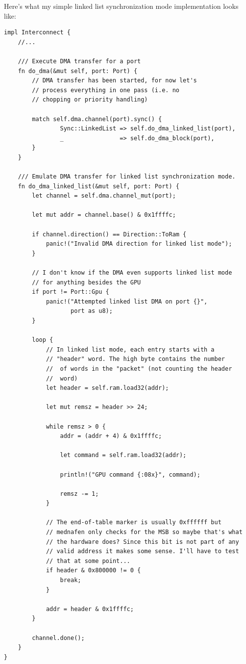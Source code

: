\documentclass[a4paper]{article}
\begin{document}
Here's what my simple linked list synchronization mode implementation
looks like:

\begin{lstlisting}
impl Interconnect {
    //...

    /// Execute DMA transfer for a port
    fn do_dma(&mut self, port: Port) {
        // DMA transfer has been started, for now let's
        // process everything in one pass (i.e. no
        // chopping or priority handling)

        match self.dma.channel(port).sync() {
                Sync::LinkedList => self.do_dma_linked_list(port),
                _                => self.do_dma_block(port),
        }
    }

    /// Emulate DMA transfer for linked list synchronization mode.
    fn do_dma_linked_list(&mut self, port: Port) {
        let channel = self.dma.channel_mut(port);

        let mut addr = channel.base() & 0x1ffffc;

        if channel.direction() == Direction::ToRam {
            panic!("Invalid DMA direction for linked list mode");
        }

        // I don't know if the DMA even supports linked list mode
        // for anything besides the GPU
        if port != Port::Gpu {
            panic!("Attempted linked list DMA on port {}",
                   port as u8);
        }

        loop {
            // In linked list mode, each entry starts with a
            // "header" word. The high byte contains the number
            //  of words in the "packet" (not counting the header
            //  word)
            let header = self.ram.load32(addr);

            let mut remsz = header >> 24;

            while remsz > 0 {
                addr = (addr + 4) & 0x1ffffc;

                let command = self.ram.load32(addr);

                println!("GPU command {:08x}", command);

                remsz -= 1;
            }

            // The end-of-table marker is usually 0xffffff but
            // mednafen only checks for the MSB so maybe that's what
            // the hardware does? Since this bit is not part of any
            // valid address it makes some sense. I'll have to test
            // that at some point...
            if header & 0x800000 != 0 {
                break;
            }

            addr = header & 0x1ffffc;
        }

        channel.done();
    }
}
\end{lstlisting}
\end{document}
